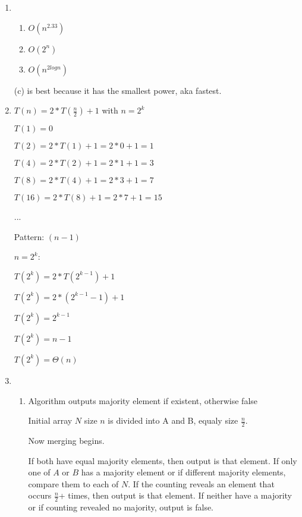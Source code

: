 \documentclass[12pt,letterpaper]{article}
\begin{document}
\begin{enumerate}
        \item %
        \begin{enumerate}
        \item %
        \(O\)$(n^{2.33})$
        
        \item %
        \(O\)$(2^n)$
        
        \item %
        \(O\)$(n^{2logn})$
        \end{enumerate}
        (c) is best because it has the smallest power, aka fastest.
            
        \item %
        $T(n) = 2 * T(\frac{n}{2}) + 1$ with $n = 2^k$
        
        $T(1) = 0$
        
        $T(2) = 2 * T(1) + 1 = 2 * 0 + 1 = 1$
        
        $T(4) = 2 * T(2) + 1 = 2 * 1 + 1 = 3$
        
        $T(8) = 2 * T(4) + 1 = 2 * 3 + 1 = 7$
        
        $T(16) = 2 * T(8) + 1 = 2 * 7 + 1 = 15$
        
        ...
        
        Pattern: $(n-1)$
        
        $n = 2^k$:
        
        $T(2^k) = 2 * T(2^{k-1}) + 1$
        
        $T(2^k) = 2 * (2^{k-1} - 1) + 1$
        
        $T(2^k) = 2^{k-1}$
        
        $T(2^k) = n - 1$
        
        $T(2^k) = \Theta(n)$
            
        \item %
        \begin{enumerate}
        \item %
        Algorithm outputs majority element if existent, otherwise false
        
        Initial array $N$ size $n$ is divided into A and B, equaly size $\frac{n}{2}$.
        
        Now merging begins.
        
        If both have equal majority elements, then output is that element. If only one of $A$ or $B$ has a majority element or if different majority elements, compare them to each of $N$. If the counting reveals an element that occurs $\frac{n}{2}$+ times, then output is that element. If neither have a majority or if counting revealed no majority, output is false.
        

\end{enumerate}
\end{enumerate}
\end{document}
